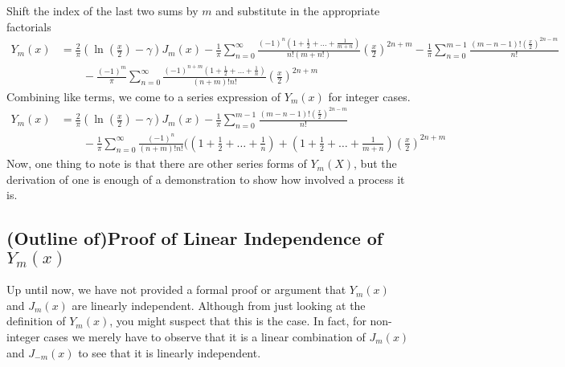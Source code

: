 \documentclass[]{article}
\begin{document}
Shift the index of the last two sums by $m$ and substitute in the appropriate factorials
\begin{align}
	Y_m(x)&= \frac{2}{\pi}\left( \ln(\frac{x}{2}) - \gamma \right) J_m(x) - \frac{1}{\pi}\sum_{n=0}^{\infty} \frac{(-1)^n(1 + \frac{1}{2} + \ldots + \frac{1}{m+n}) }{n!(m+n!)} 	\left(\frac{x}{2}\right)^{2n+m} 
	- \frac{1}{\pi} \sum_{n=0}^{m-1} \frac{(m-n-1)! \left(\frac{x}{2}\right)^{2n-m}}{n!} \nonumber \\
	& \qquad - \frac{(-1)^m}{\pi} \sum_{n=0}^{\infty} \frac{(-1)^{n+m}(1 + \frac{1}{2} + \ldots + \frac{1}{n})  }{(n+m)!n!} \left(\frac{x}{2}\right)^{2n+m} 
\end{align}
Combining like terms, we come to a series expression of $Y_m(x)$ for integer cases.
\begin{equation} \label{eq:Yseries}
	\boxed{
	\begin{aligned}
	Y_m(x)&= \frac{2}{\pi}\left( \ln(\frac{x}{2}) - \gamma \right) J_m(x) 
	- \frac{1}{\pi} \sum_{n=0}^{m-1} \frac{(m-n-1)! \left(\frac{x}{2}\right)^{2n-m}}{n!}  \\
	& \qquad - \frac{1}{\pi} \sum_{n=0}^{\infty} \frac{(-1)^{n}  }{(n+m)!n!} ((1 + \frac{1}{2} + \ldots + \frac{1}{n}) + (1+ \frac{1}{2} + \ldots + \frac{1}{m+n})\left(\frac{x}{2}\right)^{2n+m}
	\end{aligned} 
	}
\end{equation}
Now, one thing to note is that there are other series forms of $Y_m(X)$, but the derivation of one is enough of a demonstration to show how involved a process it is.
\subsection*{(Outline of)Proof of Linear Independence of $Y_m(x)$}
Up until now, we have not provided a formal proof or argument that $Y_m(x)$ and $J_m(x)$ are linearly independent. Although from just looking at the definition of $Y_m(x)$, you might suspect that this is the case. In fact, for non-integer cases we merely have to observe that it is a linear combination of $J_m(x)$ and $J_{-m}(x)$ to see that it is linearly independent.
\end{document}
